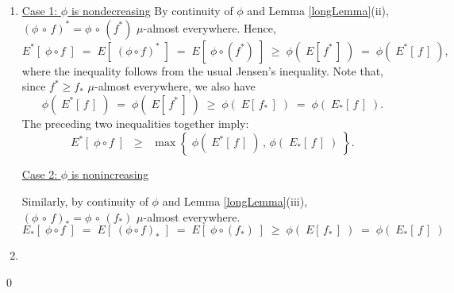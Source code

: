 \begin{enumerate}
\item
	\underline{Case 1: $\phi$ is nondecreasing}
	\vskip 0.0cm
	\noindent
	By continuity of $\phi$ and Lemma \ref{longLemma}(ii),
	$(\phi\,\circ\,f)^{*} = \phi\,\circ\,(f^{*})$ $\mu$-almost everywhere.
	Hence,
	\begin{equation*}
	E^{*}\!\left[\;\phi \circ f\;\right]
		\;=\; E\!\left[\;(\phi \circ f)^{*}\;\right]
		\;=\; E\!\left[\;\phi \circ (f^{*})\;\right]
		\;\geq\; \phi(\;E[\,f^{*}\,]\;)
		\;=\; \phi(\;E^{*}[\,f\,]\;),
	\end{equation*}
	where the inequality follows from the usual Jensen's inequality.
	Note that, since $f^{*} \geq f_{*}$ $\mu$-almost everywhere, we also have
	\begin{equation*}
	\phi(\;E^{*}[\,f\,]\;)
		\;=\; \phi(\;E[\,f^{*}\,]\;)
		\;\geq\; \phi(\;E[\,f_{*}\,]\;)
		\;=\; \phi(\;E_{*}[\,f\,]\;).
	\end{equation*}
	The preceding two inequalities together imply:
	\begin{equation*}
	E^{*}\!\left[\;\phi \circ f\;\right]
		\;\;\geq\;\; \max\!\left\{\;\phi(\;E^{*}[\,f\,]\;) \,,\, \phi(\;E_{*}[\,f\,]\;)\;\right\}.
	\end{equation*}

	\vskip 0.0cm
	\underline{Case 2: $\phi$ is nonincreasing}
	\vskip 0.0cm
	\noindent

	\vskip 0.0cm
	\noindent
	Similarly, by continuity of $\phi$ and Lemma \ref{longLemma}(iii),
	$(\phi\,\circ\,f)_{*} = \phi\,\circ\,(f_{*})$ $\mu$-almost everywhere.
	\begin{equation*}
	E_{*}\!\left[\;\phi \circ f\;\right]
		\;=\; E\!\left[\;(\phi \circ f)_{*}\;\right]
		\;=\; E\!\left[\;\phi \circ (f_{*})\;\right]
		\;\geq\; \phi(\;E[\,f_{*}\,]\;)
		\;=\; \phi(\;E_{*}[\,f\,]\;)
	\end{equation*}
\item
\end{enumerate}

\qed



\renewcommand{\theenumi}{\roman{enumi}}
\renewcommand{\labelenumi}{\textnormal{(\theenumi)}$\;\;$}

